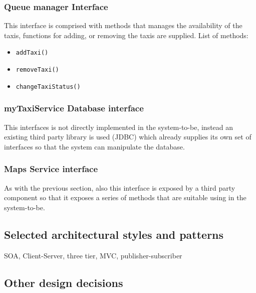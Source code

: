 \subsubsection{Queue manager Interface}
This interface is comprised with methods that manages the availability of the taxis, functions for adding, or removing the taxis are supplied. \newline
List of methods:
\begin{itemize}
	\item \texttt{addTaxi()}
	\item \texttt{removeTaxi()}
	\item \texttt{changeTaxiStatus()}
\end{itemize}
\subsubsection{myTaxiService Database interface}
This interfaces is not directly implemented in the system-to-be, instead an existing third party library is used (JDBC) which already supplies its own set of interfaces so that the system can manipulate the database.
\subsubsection{Maps Service interface}
As with the previous section, also this interface is exposed by a third party component so that it exposes a series of methods that are suitable using in the system-to-be.
\subsection{Selected architectural styles and patterns}
\label{sec:arch-styles-patterns}

SOA, Client-Server, three tier, MVC, publisher-subscriber
\subsection{Other design decisions}